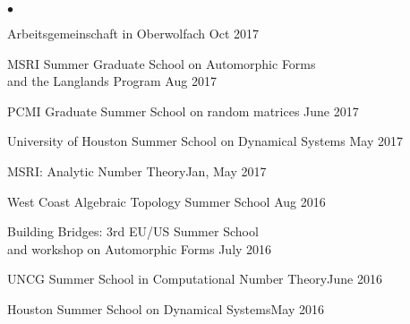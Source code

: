 \documentclass[margin,line,pifont,palatino,courier,10pt]{res}
\newenvironment{list1}{
  \begin{list}{$\bullet$}{%
      \setlength{\itemsep}{0in}
      \setlength{\parsep}{0in} \setlength{\parskip}{0in}
      \setlength{\topsep}{0in} \setlength{\partopsep}{0in}
      \setlength{\leftmargin}{0.17in}}}{\end{list}}
\begin{document}
\begin{resume}
\begin{list1}
\item {Arbeitsgemeinschaft in Oberwolfach} {\hfill  Oct 2017}

\item {MSRI Summer Graduate School on Automorphic Forms \\and the Langlands Program} {\hfill  Aug 2017}
 
 \item {PCMI Graduate Summer School on random matrices} {\hfill  June 2017}
 
\item { University of Houston Summer School on Dynamical Systems} {\hfill  May 2017}

\item {MSRI: Analytic Number Theory}{\hfill  Jan, May 2017}

\item { West Coast Algebraic Topology Summer School} {\hfill  Aug 2016}

\item { Building Bridges: 3rd EU/US Summer School \\and workshop on Automorphic Forms} {\hfill  July 2016}
 
\item  UNCG Summer School in Computational Number Theory{\hfill  June 2016}
 
\item  Houston Summer School on Dynamical Systems{\hfill  May 2016}


\end{list1}
\end{resume}
\end{document}
